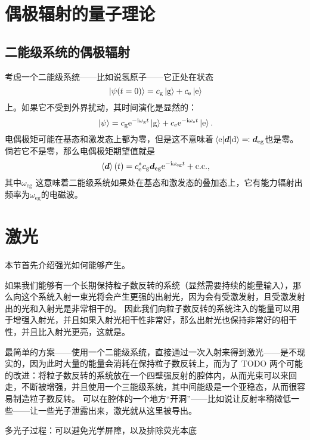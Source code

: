 \chapter{偶极辐射的量子理论}

\section{二能级系统的偶极辐射}

考虑一个二能级系统——比如说氢原子——它正处在状态
\begin{equation}
    \ket*{\psi(t=0)} = c_\text{g} \ket*{\text{g}} + c_\text{e} \ket*{\text{e}}
\end{equation}
上。如果它不受到外界扰动，其时间演化是显然的：
\begin{equation}
    \ket*{\psi} = c_\text{g} \mathrm{e}^{- \mathrm{i} \omega_\text{g} t} \ket*{\text{g}} + c_\text{e} \mathrm{e}^{- \mathrm{i} \omega_\text{e} t} \ket*{\text{e}}.
\end{equation}
电偶极矩可能在基态和激发态上都为零，但是这不意味着$\mel{\text{e}}{\vb*{d}}{\text{d}} \eqqcolon \vb*{d}_\text{eg}$也是零。
倘若它不是零，那么电偶极矩期望值就是
\begin{equation}
    \expval*{\vb*{d}}(t) = c^*_\text{e} c_\text{g} \vb*{d}_{\text{eg}} \mathrm{e}^{- \mathrm{i} \omega_\text{eg} t} + \text{c.c.},
\end{equation}
其中$\omega_\text{eg}$
这意味着二能级系统如果处在基态和激发态的叠加态上，它有能力辐射出频率为$\omega_\text{eg}$的电磁波。



\chapter{激光}

本节首先介绍强光如何能够产生。

如果我们能够有一个长期保持粒子数反转的系统（显然需要持续的能量输入），那么向这个系统入射一束光将会产生更强的出射光，因为会有受激发射，且受激发射出的光和入射光是非常相干的。
因此我们向粒子数反转的系统注入的能量可以用于增强入射光，并且如果入射光相干性非常好，那么出射光也保持非常好的相干性，并且比入射光更亮，这就是。

最简单的方案——使用一个二能级系统，直接通过一次入射来得到激光——是不现实的，因为此时大量的能量会消耗在保持粒子数反转上，而为了 TODO
两个可能的改进：将粒子数反转的系统放在一个四壁强反射的腔体内，从而光束可以来回走，不断被增强，并且使用一个三能级系统，其中间能级是一个亚稳态，从而很容易制造粒子数反转。
可以在腔体的一个地方“开洞”——比如说让反射率稍微低一些——让一些光子泄露出来，激光就从这里被导出。

多光子过程：可以避免光学屏障，以及排除荧光本底